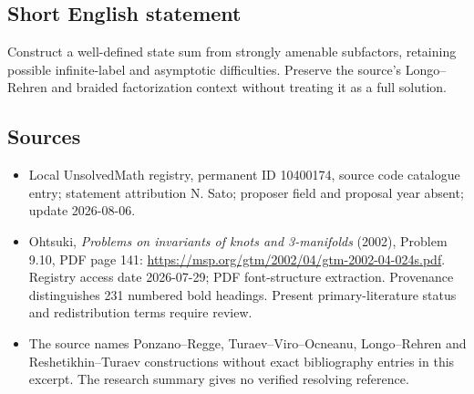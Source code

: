 \documentclass[11pt]{article}
\begin{document}
\subsection{Short English statement}
Construct a well-defined state sum from strongly amenable subfactors, retaining possible infinite-label and asymptotic difficulties. Preserve the source's Longo--Rehren and braided factorization context without treating it as a full solution.
\subsection{Sources}
\begin{itemize}
\item Local UnsolvedMath registry, permanent ID 10400174, source code catalogue entry; statement attribution N. Sato; proposer field and proposal year absent; update 2026-08-06.
\item Ohtsuki, \emph{Problems on invariants of knots and 3-manifolds} (2002), Problem 9.10, PDF page 141: \url{https://msp.org/gtm/2002/04/gtm-2002-04-024s.pdf}. Registry access date 2026-07-29; PDF font-structure extraction. Provenance distinguishes 231 numbered bold headings. Present primary-literature status and redistribution terms require review.
\item The source names Ponzano--Regge, Turaev--Viro--Ocneanu, Longo--Rehren and Reshetikhin--Turaev constructions without exact bibliography entries in this excerpt. The research summary gives no verified resolving reference.
\end{itemize}
\end{document}
